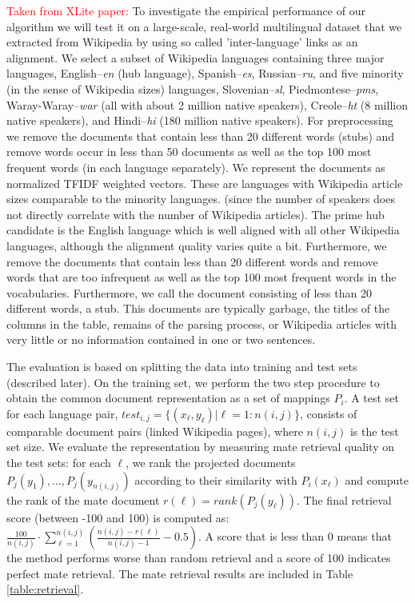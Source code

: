 \documentclass[twoside,11pt]{article}
\newcommand{\oldText}[1]{\textcolor{red}{#1:}\color{blue}}
\begin{document}
{\oldText{Taken from XLite paper}
To investigate the empirical performance of our algorithm we will test it on a large-scale, real-world multilingual dataset that we extracted from Wikipedia  by  using so called 'inter-language' links as an alignment. We select a subset of Wikipedia languages containing three major languages, English--\emph{en} (hub language), Spanish--\emph{es}, Russian--\emph{ru}, and five minority (in the sense of Wikipedia sizes) languages, Slovenian--\emph{sl}, Piedmontese--\emph{pms}, Waray-Waray--\emph{war} (all with about 2 million native speakers), Creole--\emph{ht} (8 million native speakers), and Hindi--\emph{hi} (180 million native speakers). For preprocessing we remove the documents that contain less than 20 different words (stubs) and remove words occur in less than 50 documents as well as the top 100 most frequent words (in each language separately). We represent the documents as normalized TFIDF\cite{Salton88term-weightingapproaches} weighted vectors. These are languages with Wikipedia article sizes comparable to the minority languages.  (since the number of speakers does not directly correlate with the number of Wikipedia articles). The prime hub candidate is the English language which is well aligned with all other Wikipedia languages, although the alignment quality varies quite a bit. Furthermore, we remove the documents that contain less than 20 different words and remove words that are too infrequent as well as the top 100 most frequent words in the vocabularies. Furthermore, we call the document consisting of less than 20 different words, a stub. This documents are typically garbage, the titles of the columns in the table, remains of the parsing process, or Wikipedia articles with very little or no information contained in one or two sentences.

The evaluation is based on splitting the data into training and test sets (described later). On the training set, we perform the two step procedure to obtain the common document representation as a set of mappings $P_i$. A test set for each language pair, $test_{i,j} = \{(x_\ell,y_\ell) | \ell = 1:n(i,j)\} $, consists of comparable document pairs (linked Wikipedia pages), where $n(i,j)$ is the test set size. We evaluate the representation by measuring mate retrieval quality on the test sets: for each $\ell$, we rank the projected documents $P_j(y_1),\ldots, P_j(y_{n(i,j)})$ according to their similarity with $P_i(x_\ell)$ and compute the rank of the mate document $r(\ell) = rank(P_j(y_\ell))$. The final retrieval score (between -100 and 100) is computed as: $\frac{100}{n(i,j)} \cdot \sum_{\ell = 1}^{n(i,j)} \left( \frac{n(i,j) - r(\ell)}{n(i,j) -1} -0.5\right)$. A score that is less than 0 means that the method performs worse than random retrieval and a score of 100 indicates perfect mate retrieval. The mate retrieval results are included in Table \ref{table:retrieval}.

}
\end{document}
